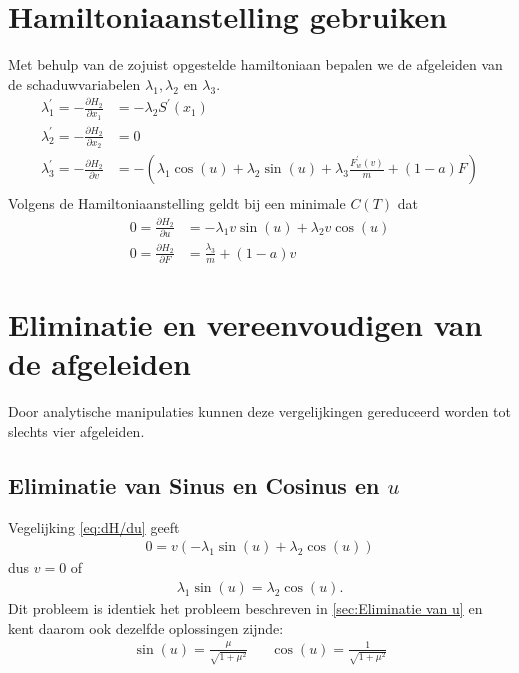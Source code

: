 \section{Hamiltoniaanstelling gebruiken}
Met behulp van de zojuist opgestelde hamiltoniaan bepalen we de afgeleiden van de schaduwvariabelen \(\lambda_1, \lambda_2\) en \(\lambda_3\).
\begin{align}
	\lambda_1^\prime = -\frac{\partial H_2}{\partial x_1} &= -\lambda_2 S^\prime(x_1)\label{eq:lambda1'} \\ 
	\lambda_2^\prime = -\frac{\partial H_2}{\partial x_2} & = 0 \label{eq:lambda2'}\\ 
	\lambda_3^\prime = -\frac{\partial H_2}{\partial v} &= -(\lambda_1 \cos(u)+\lambda_2 \sin (u) +\lambda_3 \frac{F_w^\prime(v)}{m} +(1-a)F) \label{eq:lambda3'}\\
\end{align}
Volgens de Hamiltoniaanstelling geldt bij een minimale \(C(T)\) dat
\begin{align}
	0 = \frac{\partial H_2}{\partial u} &= -\lambda_1 v \sin(u)+\lambda_2 v \cos(u)\label{eq:dH/du}\\ 
	0 =	\frac{\partial H_2}{\partial F} &= \frac{\lambda_3}{m} + (1-a)v \label{eq:dH/dF}
\end{align}

\section{Eliminatie en vereenvoudigen van de afgeleiden}
Door analytische manipulaties kunnen deze vergelijkingen gereduceerd worden tot slechts vier afgeleiden.
\subsection{Eliminatie van Sinus en Cosinus en \(u\)}		
Vegelijking \eqref{eq:dH/du} geeft
	\begin{align*}
	0 = v(-\lambda_1\sin(u) + \lambda_2 \cos(u))
\end{align*}
dus \(v=0\) of
\begin{align*}
	\lambda_1 \sin(u) = \lambda_2\cos(u).
\end{align*}
Dit probleem is identiek het probleem beschreven in \ref{sec:Eliminatie van u} en kent daarom ook dezelfde oplossingen zijnde:
\begin{align}
	\sin(u) = \frac{\mu}{\sqrt{1+\mu^2}} &&
	\cos(u) = \frac{1}{\sqrt{1+\mu^2}} \label{eq:Coswaarde}
\end{align} 


